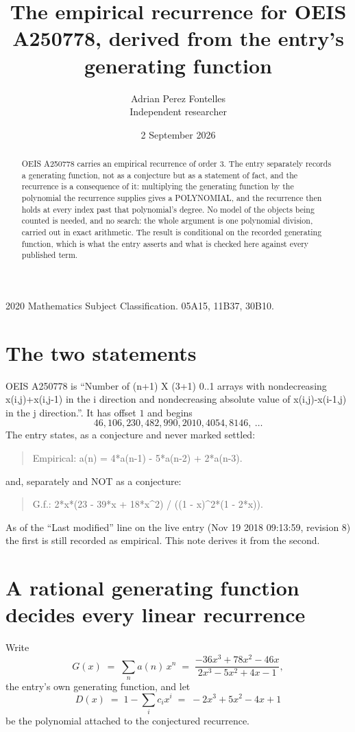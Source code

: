 \documentclass[11pt,a4paper]{article}
\title{The empirical recurrence for OEIS A250778, derived from the entry's generating function}
\author{Adrian Perez Fontelles\\ \small Independent researcher}
\date{2 September 2026}
\theoremstyle{plain}
\theoremstyle{definition}
\begin{document}
\maketitle

\begin{abstract}
OEIS A250778 carries an empirical recurrence of order $3$. The entry separately records a
generating function, not as a conjecture but as a statement of fact, and the recurrence is a
consequence of it: multiplying the generating function by the polynomial the recurrence
supplies gives a POLYNOMIAL, and the recurrence then holds at every index past that
polynomial's degree. No model of the objects being counted is needed, and no search: the
whole argument is one polynomial division, carried out in exact arithmetic. The result is
conditional on the recorded generating function, which is what the entry asserts and what is
checked here against every published term.
\end{abstract}

\noindent\small 2020 Mathematics Subject Classification. 05A15, 11B37, 30B10.\normalsize

\section{The two statements}

OEIS A250778 is ``Number of (n+1) X (3+1) 0..1 arrays with nondecreasing x(i,j)+x(i,j-1) in the i direction and nondecreasing absolute value of x(i,j)-x(i-1,j) in the j direction.''. It has offset $1$ and begins
\[
46, 106, 230, 482, 990, 2010, 4054, 8146,\ \dots
\]
The entry states, as a conjecture and never marked settled:
\begin{quote}
Empirical: a(n) = 4*a(n-1) - 5*a(n-2) + 2*a(n-3).
\end{quote}
and, separately and NOT as a conjecture:
\begin{quote}
G.f.: 2*x*(23 - 39*x + 18*x\^{}2) / ((1 - x)\^{}2*(1 - 2*x)).
\end{quote}
As of the ``Last modified'' line on the live entry (Nov 19 2018 09:13:59, revision 8) the first is still
recorded as empirical. This note derives it from the second.

\section{A rational generating function decides every linear recurrence}

Write
\[
G(x)\;=\;\sum_{n}a(n)\,x^{n}\;=\;\frac{- 36 x^{3} + 78 x^{2} - 46 x}{2 x^{3} - 5 x^{2} + 4 x - 1},
\]
the entry's own generating function, and let
\[
D(x)\;=\;1-\sum_i c_i x^{i}\;=\;- 2 x^{3} + 5 x^{2} - 4 x + 1
\]
be the polynomial attached to the conjectured recurrence.
\end{document}
